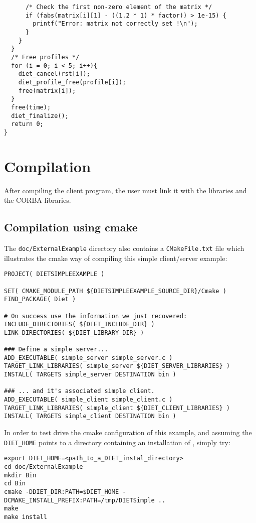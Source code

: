 {\begin{verbatim}
      /* Check the first non-zero element of the matrix */
      if (fabs(matrix[i][1] - ((1.2 * 1) * factor)) > 1e-15) {
        printf("Error: matrix not correctly set !\n");
      }
    }
  }
  /* Free profiles */
  for (i = 0; i < 5; i++){
    diet_cancel(rst[i]);
    diet_profile_free(profile[i]);
    free(matrix[i]);
  }
  free(time);
  diet_finalize();
  return 0;
}
\end{verbatim}
}

\section{Compilation}
\label{sec:cl_comp}

After compiling the client program, the user must link it with the
\diet libraries and the CORBA libraries.

\subsection{Compilation using cmake}

The \texttt{doc/ExternalExample} directory also contains a
\texttt{CMakeFile.txt} file which illustrates the cmake way of compiling
this simple client/server example:
{\footnotesize
\begin{verbatim}
PROJECT( DIETSIMPLEEXAMPLE )

SET( CMAKE_MODULE_PATH ${DIETSIMPLEEXAMPLE_SOURCE_DIR}/Cmake )
FIND_PACKAGE( Diet )

# On success use the information we just recovered:
INCLUDE_DIRECTORIES( ${DIET_INCLUDE_DIR} )
LINK_DIRECTORIES( ${DIET_LIBRARY_DIR} )

### Define a simple server...
ADD_EXECUTABLE( simple_server simple_server.c )
TARGET_LINK_LIBRARIES( simple_server ${DIET_SERVER_LIBRARIES} )
INSTALL( TARGETS simple_server DESTINATION bin )

### ... and it's associated simple client.
ADD_EXECUTABLE( simple_client simple_client.c )
TARGET_LINK_LIBRARIES( simple_client ${DIET_CLIENT_LIBRARIES} )
INSTALL( TARGETS simple_client DESTINATION bin )
\end{verbatim}
}

In order to test drive the cmake configuration of this example, and
assuming the \texttt{DIET\_HOME} points to a directory containing
an installation of \diet, simply try:

{\footnotesize
\begin{verbatim}
export DIET_HOME=<path_to_a_DIET_instal_directory>
cd doc/ExternalExample
mkdir Bin
cd Bin
cmake -DDIET_DIR:PATH=$DIET_HOME -DCMAKE_INSTALL_PREFIX:PATH=/tmp/DIETSimple ..
make
make install
\end{verbatim}
}

